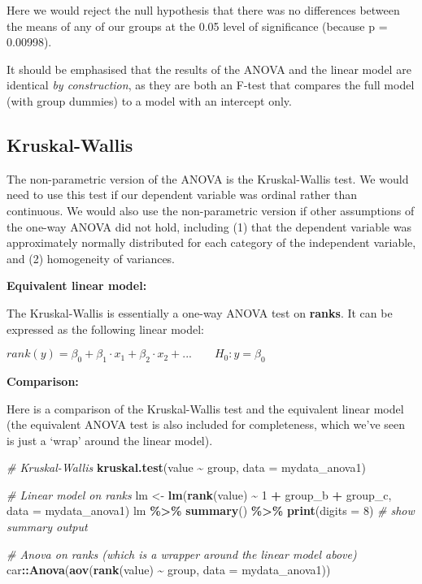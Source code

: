 \documentclass[
  12pt,
]{krantz}
\newenvironment{Shaded}{\begin{snugshade}}{\end{snugshade}}
\newcommand{\CommentTok}[1]{\textcolor[rgb]{0.56,0.35,0.01}{\textit{#1}}}
\newcommand{\DataTypeTok}[1]{\textcolor[rgb]{0.13,0.29,0.53}{#1}}
\newcommand{\DecValTok}[1]{\textcolor[rgb]{0.00,0.00,0.81}{#1}}
\newcommand{\KeywordTok}[1]{\textcolor[rgb]{0.13,0.29,0.53}{\textbf{#1}}}
\newcommand{\NormalTok}[1]{#1}
\newcommand{\OperatorTok}[1]{\textcolor[rgb]{0.81,0.36,0.00}{\textbf{#1}}}
\newcommand{\StringTok}[1]{\textcolor[rgb]{0.31,0.60,0.02}{#1}}
\begin{document}
Here we would reject the null hypothesis that there was no differences between the means of any of our groups at the 0.05 level of significance (because p = 0.00998).

It should be emphasised that the results of the ANOVA and the linear model are identical \emph{by construction}, as they are both an F-test that compares the full model (with group dummies) to a model with an intercept only.

\hypertarget{kruskal-wallis}{%
\subsection{Kruskal-Wallis}\label{kruskal-wallis}}

The non-parametric version of the ANOVA is the Kruskal-Wallis test. We would need to use this test if our dependent variable was ordinal rather than continuous. We would also use the non-parametric version if other assumptions of the one-way ANOVA did not hold, including (1) that the dependent variable was approximately normally distributed for each category of the independent variable, and (2) homogeneity of variances.

\textbf{Equivalent linear model:}

The Kruskal-Wallis is essentially a one-way ANOVA test on \textbf{ranks}. It can be expressed as the following linear model:

\(rank(y) = \beta_0 + \beta_1 \cdot x_1 + \beta_2 \cdot x_2 + ... \qquad H_0: y = \beta_0\)

\textbf{Comparison:}

Here is a comparison of the Kruskal-Wallis test and the equivalent linear model (the equivalent ANOVA test is also included for completeness, which we've seen is just a `wrap' around the linear model).

\begin{Shaded}
\begin{Highlighting}[]
\CommentTok{\# Kruskal{-}Wallis}
\KeywordTok{kruskal.test}\NormalTok{(value }\OperatorTok{\textasciitilde{}}\StringTok{ }\NormalTok{group, }\DataTypeTok{data =}\NormalTok{ mydata\_anova1)}

\CommentTok{\# Linear model on ranks}
\NormalTok{lm \textless{}{-}}\StringTok{ }\KeywordTok{lm}\NormalTok{(}\KeywordTok{rank}\NormalTok{(value) }\OperatorTok{\textasciitilde{}}\StringTok{ }\DecValTok{1} \OperatorTok{+}\StringTok{ }\NormalTok{group\_b }\OperatorTok{+}\StringTok{ }\NormalTok{group\_c, }\DataTypeTok{data =}\NormalTok{ mydata\_anova1)}
\NormalTok{  lm }\OperatorTok{\%\textgreater{}\%}\StringTok{ }\KeywordTok{summary}\NormalTok{() }\OperatorTok{\%\textgreater{}\%}\StringTok{ }\KeywordTok{print}\NormalTok{(}\DataTypeTok{digits =} \DecValTok{8}\NormalTok{) }\CommentTok{\# show summary output}

\CommentTok{\# Anova on ranks (which is a wrapper around the linear model above)}
\NormalTok{car}\OperatorTok{::}\KeywordTok{Anova}\NormalTok{(}\KeywordTok{aov}\NormalTok{(}\KeywordTok{rank}\NormalTok{(value) }\OperatorTok{\textasciitilde{}}\StringTok{ }\NormalTok{group, }\DataTypeTok{data =}\NormalTok{ mydata\_anova1))}
\end{Highlighting}
\end{Shaded}
\end{document}
